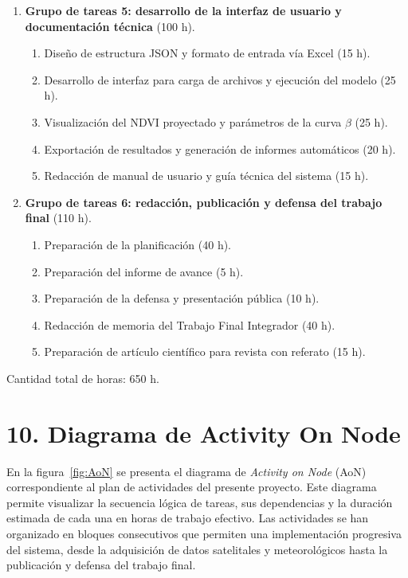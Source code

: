 \documentclass[
11pt, %
]{charter}
\begin{document}
\begin{enumerate}
\item \textbf{Grupo de tareas 5: desarrollo de la interfaz de usuario y documentación técnica} (100 h).
  \begin{enumerate} \item Diseño de estructura JSON y formato de entrada vía Excel (15 h).
	\item Desarrollo de interfaz para carga de archivos y ejecución del modelo (25 h).
	\item Visualización del NDVI proyectado y parámetros de la curva $\beta$ (25 h).
	\item Exportación de resultados y generación de informes automáticos (20 h).
	\item Redacción de manual de usuario y guía técnica del sistema (15 h).
\end{enumerate}

\item \textbf{Grupo de tareas 6: redacción, publicación y defensa del trabajo final} (110 h).
  \begin{enumerate}
	\item Preparación de la planificación (40 h).
    \item Preparación del informe de avance (5 h).
    \item Preparación de la defensa y presentación pública (10 h).
    \item Redacción de memoria del Trabajo Final Integrador (40 h).
    \item Preparación de artículo científico para revista con referato (15 h).
  \end{enumerate}


\end{enumerate}

Cantidad total de horas: 650 h.

\pagebreak

\section{10. Diagrama de Activity On Node}
\label{sec:AoN}
En la figura~\ref{fig:AoN} se presenta el diagrama de \textit{Activity on Node} (AoN) correspondiente al plan de actividades del presente proyecto. Este diagrama permite visualizar la secuencia lógica de tareas, sus dependencias y la duración estimada de cada una en horas de trabajo efectivo. Las actividades se han organizado en bloques consecutivos que permiten una implementación progresiva del sistema, desde la adquisición de datos satelitales y meteorológicos hasta la publicación y defensa del trabajo final.
\end{document}
